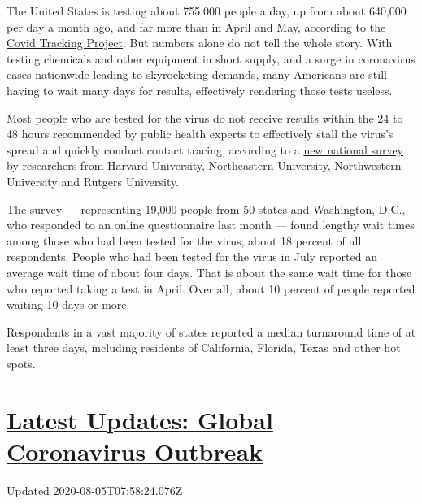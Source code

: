 The United States is testing about 755,000 people a day, up from about
640,000 per day a month ago, and far more than in April and May,
\href{https://covidtracking.com/data/us-daily}{according to the Covid
Tracking Project}. But numbers alone do not tell the whole story. With
testing chemicals and other equipment in short supply, and a surge in
coronavirus cases nationwide leading to skyrocketing demands, many
Americans are still having to wait many days for results, effectively
rendering those tests useless.

Most people who are tested for the virus do not receive results within
the 24 to 48 hours recommended by public health experts to effectively
stall the virus's spread and quickly conduct contact tracing, according
to a
\href{https://covidstates.net/COVID19\%20CONSORTIUM\%20REPORT\%208\%20TEST\%20JULY\%202020.pdf}{new
national survey} by researchers from Harvard University, Northeastern
University, Northwestern University and Rutgers University.

The survey --- representing 19,000 people from 50 states and Washington,
D.C., who responded to an online questionnaire last month --- found
lengthy wait times among those who had been tested for the virus, about
18 percent of all respondents. People who had been tested for the virus
in July reported an average wait time of about four days. That is about
the same wait time for those who reported taking a test in April. Over
all, about 10 percent of people reported waiting 10 days or more.

Respondents in a vast majority of states reported a median turnaround
time of at least three days, including residents of California, Florida,
Texas and other hot spots.

\hypertarget{latest-updates-global-coronavirus-outbreak}{%
\section{\texorpdfstring{\href{https://www.nytimes.com/2020/08/04/world/coronavirus-cases.html?action=click\&pgtype=Article\&state=default\&region=MAIN_CONTENT_1\&context=storylines_live_updates}{Latest
Updates: Global Coronavirus
Outbreak}}{Latest Updates: Global Coronavirus Outbreak}}\label{latest-updates-global-coronavirus-outbreak}}

Updated 2020-08-05T07:58:24.076Z

